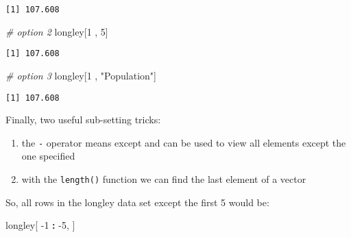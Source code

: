 \documentclass[]{article}
\newenvironment{Shaded}{\begin{snugshade}}{\end{snugshade}}
\newcommand{\CommentTok}[1]{\textcolor[rgb]{0.56,0.35,0.01}{\textit{#1}}}
\newcommand{\DecValTok}[1]{\textcolor[rgb]{0.00,0.00,0.81}{#1}}
\newcommand{\NormalTok}[1]{#1}
\newcommand{\OperatorTok}[1]{\textcolor[rgb]{0.81,0.36,0.00}{\textbf{#1}}}
\newcommand{\StringTok}[1]{\textcolor[rgb]{0.31,0.60,0.02}{#1}}
\providecommand{\tightlist}{%
  \setlength{\itemsep}{0pt}\setlength{\parskip}{0pt}}
\begin{document}
\begin{Shaded}
\end{Shaded}

\begin{verbatim}
[1] 107.608
\end{verbatim}

\begin{Shaded}
\begin{Highlighting}[]
\CommentTok{# option 2}
\NormalTok{longley[}\DecValTok{1}\NormalTok{ , }\DecValTok{5}\NormalTok{]}
\end{Highlighting}
\end{Shaded}

\begin{verbatim}
[1] 107.608
\end{verbatim}

\begin{Shaded}
\begin{Highlighting}[]
\CommentTok{# option 3}
\NormalTok{longley[}\DecValTok{1}\NormalTok{ , }\StringTok{"Population"}\NormalTok{]}
\end{Highlighting}
\end{Shaded}

\begin{verbatim}
[1] 107.608
\end{verbatim}

Finally, two useful sub-setting tricks:

\begin{enumerate}
\def\labelenumi{\arabic{enumi}.}
\tightlist
\item
  the \texttt{-} operator means except and can be used to view all elements except the one specified
\item
  with the \texttt{length()} function we can find the last element of a vector
\end{enumerate}

So, all rows in the longley data set except the first 5 would be:

\begin{Shaded}
\begin{Highlighting}[]
\NormalTok{longley[ }\DecValTok{-1} \OperatorTok{:}\StringTok{ }\DecValTok{-5}\NormalTok{, ]}
\end{Highlighting}
\end{Shaded}
\end{document}
